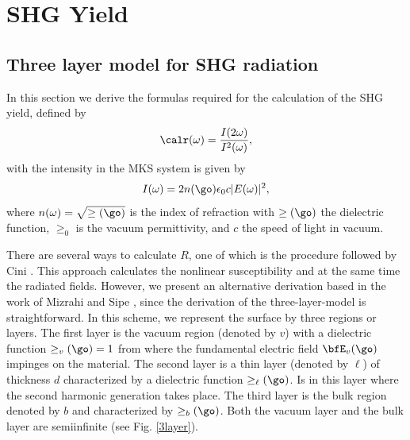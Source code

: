 \chapter{SHG Yield}
\minitoc

\section{Three layer model for SHG radiation}

In this section we derive the formulas required for the calculation of the SHG
yield, defined by
\begin{equation}\label{uno}
\calr(\omega)=\frac{I(2\omega)}{I^2(\omega)}
,
\end{equation}
with the intensity in the MKS system is given by\cite{boyd}
\begin{equation}\label{dos}
I(\omega)=2n(\go)\epsilon_0c
|E(\omega)|^2
,
\end{equation}
where $n(\omega)=\sqrt{\ge(\go)}$ is the index of refraction with
$\ge(\go)$ the dielectric function, $\ge_0$ is the vacuum permittivity,
and $c$ the speed of light in vacuum.

There are several ways to calculate $R$, one of which is the procedure followed
by Cini \cite{ciniPRB91}. This approach calculates the nonlinear susceptibility
and at the same time the radiated fields. However, we present an alternative
derivation based in the work of Mizrahi and Sipe \cite{mizrahiJOSA88}, since
the derivation of the three-layer-model is straightforward. 
In this scheme, 
we represent the surface by three regions or layers. The first layer
is the vacuum region (denoted by $v$) with a dielectric function $\ge_v(\go)=1$ from
where the fundamental electric field $\bfE_v(\go)$ impinges on the material. 
The second  layer is a thin layer (denoted by $\ell$) of thickness $d$ characterized
by a dielectric function $\ge_\ell(\go)$. Is in this layer where the
second harmonic generation takes place. The third layer is the bulk
region denoted by $b$ and characterized by $\ge_b(\go)$. 
Both the vacuum layer and the
bulk layer are semiinfinite  (see Fig. \ref{3layer}). 


